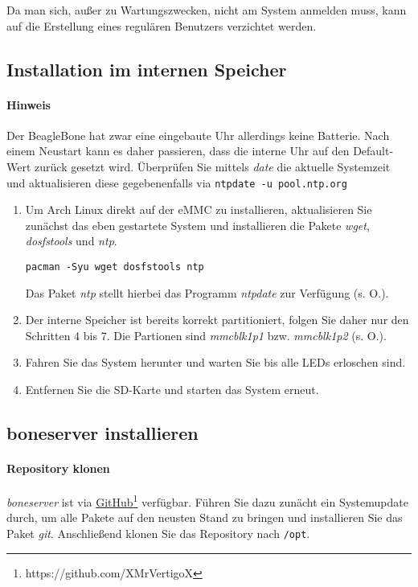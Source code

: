 Da man sich, außer zu Wartungszwecken, nicht am System anmelden muss, kann auf die Erstellung eines regulären Benutzers verzichtet werden.


\subsection{Installation im internen Speicher}

\paragraph{Hinweis} Der BeagleBone hat zwar eine eingebaute Uhr allerdings keine Batterie. Nach einem Neustart kann es daher passieren, dass die interne Uhr auf den Default-Wert zurück gesetzt wird. Überprüfen Sie mittels \emph{date} die aktuelle Systemzeit und aktualisieren diese gegebenenfalls via \texttt{ntpdate -u pool.ntp.org}

\begin{enumerate}
\item Um Arch Linux direkt auf der eMMC zu installieren, aktualisieren Sie zunächst das eben gestartete System und installieren die Pakete \emph{wget}, \emph{dosfstools} und \emph{ntp}.

\begin{lstlisting}
pacman -Syu wget dosfstools ntp
\end{lstlisting}

Das Paket \emph{ntp} stellt hierbei das Programm \emph{ntpdate} zur Verfügung (s. O.).

\item Der interne Speicher ist bereits korrekt partitioniert, folgen Sie daher nur den Schritten 4 bis 7. Die Partionen sind \textit{mmcblk1p1} bzw. \textit{mmcblk1p2} (s. O.).

\item Fahren Sie das System herunter und warten Sie bis alle LEDs erloschen sind.

\item Entfernen Sie die SD-Karte und starten das System erneut.
\end{enumerate}


\subsection{boneserver installieren}

\paragraph{Repository klonen}
\textit{boneserver} ist via \href{https://github.com/XMrVertigoX}{GitHub}\footnote{https://github.com/XMrVertigoX} verfügbar. Führen Sie dazu zunächt ein Systemupdate durch, um alle Pakete auf den neusten Stand zu bringen und installieren Sie das Paket \emph{git}. Anschließend klonen Sie das Repository nach \texttt{/opt}.

